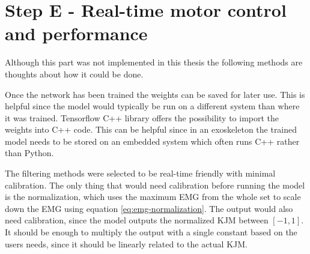 \documentclass[../main.tex]{subfiles}
\begin{document}
\section{Step E - Real-time motor control and performance}
Although this part was not implemented in this thesis the following methods are thoughts about how it could be done.

Once the network has been trained the weights can be saved for later use.
This is helpful since the model would typically be run on a different system than where it was trained.
Tensorflow C++ library offers the possibility to import the weights into C++ code.
This can be helpful since in an exoskeleton the trained model needs to be stored on an embedded system which often runs C++ rather than Python.

The filtering methods were selected to be real-time friendly with minimal calibration.
The only thing that would need calibration before running the model is the normalization, which uses the maximum \ac{EMG} from the whole set to scale down the \ac{EMG} using equation \ref{eq:emg-normalization}.
The output would also need calibration, since the model outputs the normalized \ac{KJM} between $\left[-1,1\right]$.
It should be enough to multiply the output with a single constant based on the users needs, since it should be linearly related to the actual \ac{KJM}.
\end{document}
